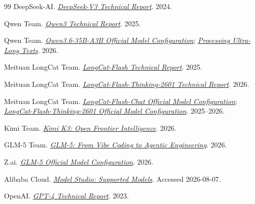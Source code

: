 \documentclass[UTF8,fontset=none,a4paper,10pt]{ctexart}
\begin{document}
\begin{thebibliography}{99}
DeepSeek-AI. \href{https://arxiv.org/abs/2412.19437}{\textit{DeepSeek-V3 Technical Report}}. 2024.

Qwen Team. \href{https://arxiv.org/abs/2505.09388}{\textit{Qwen3 Technical Report}}. 2025.

Qwen Team. \href{https://huggingface.co/Qwen/Qwen3.6-35B-A3B-FP8/blob/main/config.json}{\textit{Qwen3.6-35B-A3B Official Model Configuration}}; \href{https://huggingface.co/Qwen/Qwen3.6-35B-A3B/blob/main/README.md}{\textit{Processing Ultra-Long Texts}}. 2026.

Meituan LongCat Team. \href{https://arxiv.org/abs/2509.01322}{\textit{LongCat-Flash Technical Report}}. 2025.

Meituan LongCat Team. \href{https://arxiv.org/abs/2601.16725}{\textit{LongCat-Flash-Thinking-2601 Technical Report}}. 2026.

Meituan LongCat Team. \href{https://huggingface.co/meituan-longcat/LongCat-Flash-Chat/blob/main/config.json}{\textit{LongCat-Flash-Chat Official Model Configuration}}; \href{https://huggingface.co/meituan-longcat/LongCat-Flash-Thinking-2601-FP8/blob/main/config.json}{\textit{LongCat-Flash-Thinking-2601 Official Model Configuration}}. 2025--2026.

Kimi Team. \href{https://arxiv.org/abs/2607.24653}{\textit{Kimi K3: Open Frontier Intelligence}}. 2026.

GLM-5 Team. \href{https://arxiv.org/abs/2602.15763}{\textit{GLM-5: From Vibe Coding to Agentic Engineering}}. 2026.

Z.ai. \href{https://huggingface.co/zai-org/GLM-5/blob/main/config.json}{\textit{GLM-5 Official Model Configuration}}. 2026.

Alibaba Cloud. \href{https://help.aliyun.com/en/model-studio/models}{\textit{Model Studio: Supported Models}}. Accessed 2026-08-07.

OpenAI. \href{https://arxiv.org/abs/2303.08774}{\textit{GPT-4 Technical Report}}. 2023.

\end{thebibliography}
\end{document}
